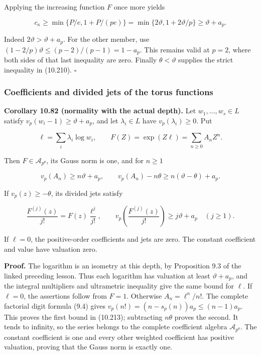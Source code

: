 \documentclass[
  11pt,
  a4paper,
]{article}
\begin{document}
Applying the increasing function \(F\) once more yields

\[
c_\kappa\ge\min\{P/e, 1+P/(pe)\}
=\min\{2\vartheta, 1+2\vartheta/p\}
\ge\vartheta+a_p.
\tag{10.211}
\]

Indeed \(2\vartheta>\vartheta+a_p\). For the other member, use
\((1-2/p)\vartheta\le(p-2)/(p-1)=1-a_p\). This remains valid at \(p=2\),
where both sides of that last inequality are zero. Finally
\(\theta<\vartheta\) supplies the strict inequality in (10.210).
\(\square\)

\subsubsection{Coefficients and divided jets of the torus
functions}\label{coefficients-and-divided-jets-of-the-torus-functions}

\textbf{Corollary 10.82 (normality with the actual depth).} Let
\(w_1,\ldots,w_s\in L\) satisfy \(v_p(w_i-1)\ge\vartheta+a_p\), and let
\(\lambda_i\in L\) have \(v_p(\lambda_i)\ge0\). Put

\[
\ell=\sum_i\lambda_i\log w_i,\qquad
F(Z)=\exp(Z\ell)=\sum_{n\ge0}A_nZ^n.
\tag{10.212}
\]

Then \(F\in\mathcal A_{p^\theta}\), its Gauss norm is one, and for
\(n\ge1\)

\[
v_p(A_n)\ge n\vartheta+a_p,\qquad
v_p(A_n)-n\theta\ge n(\vartheta-\theta)+a_p.
\tag{10.213}
\]

If \(v_p(z)\ge-\theta\), its divided jets satisfy

\[
\frac{F^{(j)}(z)}{j!}=F(z)\frac{\ell^j}{j!},\qquad
v_p\!\left(\frac{F^{(j)}(z)}{j!}\right)
\ge j\vartheta+a_p\quad(j\ge1).
\tag{10.214}
\]

If \(\ell=0\), the positive-order coefficients and jets are zero. The
constant coefficient and value have valuation zero.

\textbf{Proof.} The logarithm is an isometry at this depth, by
Proposition 9.3 of the linked preceding lesson. Thus each logarithm has
valuation at least \(\vartheta+a_p\), and the integral multipliers and
ultrametric inequality give the same bound for \(\ell\). If \(\ell=0\),
the assertions follow from \(F=1\). Otherwise \(A_n=\ell^n/n!\). The
complete factorial digit formula (9.4) gives
\(v_p(n!)=(n-s_p(n))a_p\le(n-1)a_p\). This proves the first bound in
(10.213); subtracting \(n\theta\) proves the second. It tends to
infinity, so the series belongs to the complete coefficient algebra
\(\mathcal A_{p^\theta}\). The constant coefficient is one and every
other weighted coefficient has positive valuation, proving that the
Gauss norm is exactly one.
\end{document}
